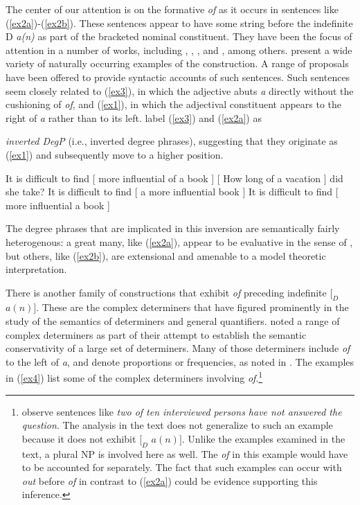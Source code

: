 \documentclass[output=paper,
modfonts
]{LSP/langsci}
\begin{document}
The center of our attention is on the formative {\textit{of}} as it occurs in sentences like ({\ref{ex2a}})-({\ref{ex2b}}).  These sentences appear to have some string  before the indefinite D {\textit{a(n)}} as part of the bracketed nominal constituent.  They have been the focus of attention in a number of works, including {\citet{Bolinger72}}, {\citet{Bresnan73}}, {\citet{Hendrick90}}, and {\citet{Kennedy00}}, among others.  {\citet{Kim11}} present a wide variety of naturally occurring examples of the construction.  A range of proposals have been offered to provide syntactic accounts of such sentences.  Such sentences seem closely related to ({\ref{ex3}}), in which the adjective abuts {\textit{a}} directly without the cushioning of {\textit{of}}, and ({\ref{ex1}}), in which the adjectival constituent appears to the right of {\textit{a}} rather than to its left.  {\citet{Kennedy00}} label ({\ref{ex3}}) and ({\ref{ex2a}}) as {\textit{inverted DegP} (i.e., inverted degree phrases), suggesting that they originate as ({\ref{ex1}})  and subsequently move to a higher position.

\begin{exe}
\ex \label{ex2a}  It is difficult to find [ more influential of a book ]
\ex \label{ex2b}  [ How long of a vacation ] did she take?
\ex \label{ex1}  It is difficult to find [ a more influential book ]
\ex \label{ex3}  It is difficult to find [ more influential a book ]
\end{exe}

The degree phrases that are implicated in this inversion are semantically fairly heterogenous:  a great many, like ({\ref{ex2a}}), appear to be evaluative in the sense of {\citet{Keenan85}}, but others, like ({\ref{ex2b}}), are extensional and amenable to a model theoretic interpretation.

There is another family of constructions that exhibit {\textit{of}} preceding indefinite $ [_{D}$ $a(n) ]$.  These are the complex determiners that have figured prominently in the study of the semantics of determiners and general quantifiers.  {\citet{Keenan86}} noted a range of complex determiners as part of their attempt to establish the semantic conservativity of a large set of determiners.  Many of those determiners include {\textit{of}} to the left of {\textit{a}}, and denote proportions or frequencies, as noted in {\citet{Peters06}}.  The examples in ({\ref{ex4}}) list some of the complex determiners involving {\textit{of}}.{\footnote{ {\citet{Peters06}} observe sentences like {\textit{two of ten interviewed persons have not answered the question}}.  The analysis in the text does not generalize to such an example because it does not exhibit $[_{D}$ $a(n) ]$.  Unlike the examples examined in the text, a plural NP is involved here as well.   The {\textit{of}} in this example would have to be accounted for separately.  The fact that such examples can occur with {\textit{out}} before {\textit{of}} in contrast to ({\ref{ex2a}}) could be evidence supporting this inference.} }

}
\end{document}
